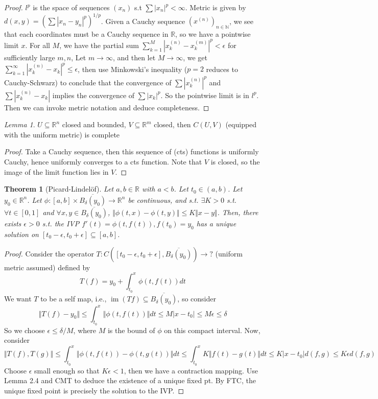 \documentclass{article}
\theoremstyle{definition}
\theoremstyle{remark}
\newtheorem{lem}[defn]{Lemma}
\theoremstyle{plain}
\newtheorem{thm}[defn]{Theorem}
\theoremstyle{definition}
\newcommand{\NN}{\mathbb{N}}
\newcommand{\RR}{\mathbb{R}}
\begin{document}
\begin{proof}
    $l^p$ is the space of sequences $(x_n)$ s.t $\sum |x_n|^p<\infty$. Metric is given by $d(x,y)=(\sum|x_n-y_n|^p)^{1/p}$.
    Given a Cauchy sequence $(x^{(n)})_{n\in\NN}$, we see that each coordinates must be a Cauchy sequence in $\RR$, so we have a pointwise limit $x$. For all $M$, we have the partial sum $\sum_{k=1}^M|x_k^{(n)}-x_{k}^{(m)}|^p<\epsilon$ for sufficiently large $m,n$, Let $m\to\infty$, and then let $M\to\infty$, we get $\sum_{k=1}^\infty|x_k^{(n)}-x_k|^p\le\epsilon$, then use Minkowski's inequality ($p=2$ reduces to Cauchy-Schwarz) to conclude that the convergence of $\sum |x_k^{(n)}|^p$ and $\sum |x_k^{(n)}-x_k|$ implies the convergence of $\sum|x_k|^p$. So the pointwise limit is in $l^p$.
    Then we can invoke metric notation and deduce completeness.
\end{proof}
\begin{lem}
    $U\subseteq \RR^n$ closed and bounded, $V\subseteq \RR^m$ closed, then $C(U,V)$ (equipped with the uniform metric) is complete
\end{lem}
\begin{proof}
    Take a Cauchy sequence, then this sequence of (cts) functions is uniformly Cauchy, hence uniformly converges to a cts function. Note that $V$ is closed, so the image of the limit function lies in $V$.
\end{proof}
\begin{thm}[Picard-Lindelöf]
    Let $a,b\in\RR$ with $a<b$. Let $t_0\in(a,b)$. Let $y_0\in\RR^n$. Let $\phi:[a,b]\times \overline{B_\delta(y_0)}\to \RR^n$ be continuous, and s.t. $\exists K>0$ s.t. $\forall t\in[0,1]$ and $\forall x,y\in \overline{B_\delta(y_0)}$, $\Vert \phi(t,x)-\phi(t,y)\Vert\le K\Vert x-y \Vert$.
    Then, there exists $\epsilon>0$ s.t. the IVP $f'(t)=\phi(t,f(t)), f(t_0)=y_0$ has a unique solution on $[t_0-\epsilon,t_0+\epsilon]\subseteq[a,b]$.
\end{thm}
\begin{proof}
    Consider the operator $T:C([t_0-\epsilon,t_0+\epsilon], \overline{B_\delta(y_0)})\to ?$ (uniform metric assumed) defined by
    \[T(f)=y_0+\int_{t_0}^x\phi(t,f(t))dt\]
    We want $T$ to be a self map, i.e., $\operatorname{im}(Tf)\subseteq \overline{B_\delta(y_0)}$, so consider
    \[\Vert T(f)-y_0\Vert\le \int_{t_0}^x\Vert \phi(t,f(t))\Vert dt\le M|x-t_0|\le M\epsilon\le \delta\]
    So we choose $\epsilon\le \delta/M$, where $M$ is the bound of $\phi$ on this compact interval. Now, consider
    \[\Vert T(f),T(g)\Vert \le \int_{t_0}^x\Vert \phi(t,f(t))-\phi(t,g(t))\Vert dt\le \int_{t_0}^x K\Vert f(t)-g(t)\Vert dt\le K|x-t_0|d(f,g)\le K\epsilon d(f,g)\]
    Choose $\epsilon$ small enough so that $K\epsilon<1$, then we have a contraction mapping. Use Lemma 2.4 and CMT to deduce the existence of a unique fixed pt. By FTC, the unique fixed point is precisely the solution to the IVP.
\end{proof}
\end{document}
